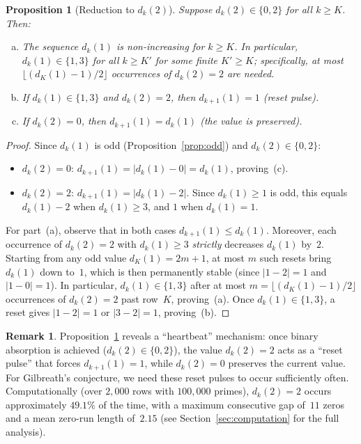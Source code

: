 \documentclass[11pt, a4paper]{amsart}
\theoremstyle{plain}
\newtheorem{proposition}[theorem]{Proposition}
\theoremstyle{definition}
\newtheorem{remark}[theorem]{Remark}
\begin{document}
\begin{proposition}[Reduction to $d_k(2)$]\label{prop:reduction}
Suppose $d_k(2) \in \{0, 2\}$ for all $k \ge K$. Then:
\begin{enumerate}[(a)]
\item The sequence $d_k(1)$ is non-increasing for $k \ge K$. In particular, $d_k(1) \in \{1, 3\}$ for all $k \ge K'$
for some finite $K' \ge K$; specifically, at most $\lfloor(d_K(1) - 1)/2\rfloor$ occurrences of $d_k(2) = 2$ are needed.
\item If $d_k(1) \in \{1,3\}$ and $d_k(2) = 2$, then $d_{k+1}(1) = 1$ (reset pulse).
\item If $d_k(2) = 0$, then $d_{k+1}(1) = d_k(1)$ (the value is preserved).
\end{enumerate}
\end{proposition}

\begin{proof}
Since $d_k(1)$ is odd (Proposition~\ref{prop:odd}) and $d_k(2) \in \{0, 2\}$:
\begin{itemize}
\item $d_k(2) = 0$: $d_{k+1}(1) = |d_k(1) - 0| = d_k(1)$, proving~(c).
\item $d_k(2) = 2$: $d_{k+1}(1) = |d_k(1) - 2|$. Since $d_k(1) \ge 1$ is odd, this equals $d_k(1) - 2$ when $d_k(1) \ge 3$, and $1$ when $d_k(1) = 1$.
\end{itemize}
For part~(a), observe that in both cases $d_{k+1}(1) \le d_k(1)$. Moreover, each occurrence of $d_k(2) = 2$ with $d_k(1) \ge 3$ \emph{strictly} 
decreases $d_k(1)$ by~$2$. Starting from any odd value $d_K(1) = 2m+1$, at most $m$ such resets bring $d_k(1)$ down to~$1$, which is then
permanently stable (since $|1-2| = 1$ and $|1-0| = 1$). In particular, $d_k(1) \in \{1, 3\}$ after at most $m = \lfloor(d_K(1)-1)/2\rfloor$
occurrences of $d_k(2) = 2$ past row~$K$, proving~(a). Once $d_k(1) \in \{1,3\}$, a reset gives $|1-2|=1$ or $|3-2|=1$, proving~(b).
\end{proof}

\begin{remark}\label{rem:heartbeat}
Proposition~\ref{prop:reduction} reveals a ``heartbeat'' mechanism: once binary absorption is achieved ($d_k(2) \in \{0,2\}$), 
the value $d_k(2) = 2$ acts as a ``reset pulse'' that forces $d_{k+1}(1) = 1$, while $d_k(2) = 0$ preserves the current value. 
For Gilbreath's conjecture, we need these reset pulses to occur sufficiently often. Computationally (over $2{,}000$ rows
with $100{,}000$ primes), $d_k(2) = 2$ occurs approximately $49.1\%$ of the time, with a maximum consecutive gap of~$11$ zeros
and a mean zero-run length of~$2.15$ (see Section~\ref{sec:computation} for the full analysis).
\end{remark}
\end{document}

